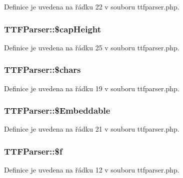 Definice je uvedena na řádku 22 v souboru ttfparser.\-php.

\hypertarget{class_t_t_f_parser_af01d90cd33a90e906db3bcbd63d78a54}{
\subsubsection[{\$cap\-Height}]{\setlength{\rightskip}{0pt plus 5cm}T\-T\-F\-Parser\-::\$cap\-Height}}\label{class_t_t_f_parser_af01d90cd33a90e906db3bcbd63d78a54}


Definice je uvedena na řádku 25 v souboru ttfparser.\-php.

\hypertarget{class_t_t_f_parser_ae450e6c969d5be14cc82a40c48697470}{
\subsubsection[{\$chars}]{\setlength{\rightskip}{0pt plus 5cm}T\-T\-F\-Parser\-::\$chars}}\label{class_t_t_f_parser_ae450e6c969d5be14cc82a40c48697470}


Definice je uvedena na řádku 19 v souboru ttfparser.\-php.

\hypertarget{class_t_t_f_parser_a511b00b1e6ca4011fe26e6d77ff542ea}{
\subsubsection[{\$\-Embeddable}]{\setlength{\rightskip}{0pt plus 5cm}T\-T\-F\-Parser\-::\$\-Embeddable}}\label{class_t_t_f_parser_a511b00b1e6ca4011fe26e6d77ff542ea}


Definice je uvedena na řádku 21 v souboru ttfparser.\-php.

\hypertarget{class_t_t_f_parser_aaa0e1e5670f133ad18e748244bf3b839}{
\subsubsection[{\$f}]{\setlength{\rightskip}{0pt plus 5cm}T\-T\-F\-Parser\-::\$f}}\label{class_t_t_f_parser_aaa0e1e5670f133ad18e748244bf3b839}


Definice je uvedena na řádku 12 v souboru ttfparser.\-php.

